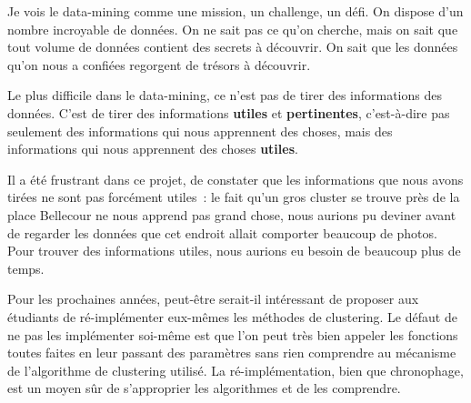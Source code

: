 Je vois le data-mining comme une mission, un challenge, un défi. On dispose d'un nombre incroyable de données. On ne sait pas ce qu'on cherche, mais on sait que tout volume de données contient des secrets à découvrir. On sait que les données qu'on nous a confiées regorgent de trésors à découvrir.

Le plus difficile dans le data-mining, ce n'est pas de tirer des informations des données. C'est de tirer des informations \textbf{utiles} et \textbf{pertinentes}, c'est-à-dire pas seulement des informations qui nous apprennent des choses, mais des informations qui nous apprennent des choses \textbf{utiles}.

Il a été frustrant dans ce projet, de constater que les informations que nous avons tirées ne sont pas forcément utiles~: le fait qu'un gros cluster se trouve près de la place Bellecour ne nous apprend pas grand chose, nous aurions pu deviner avant de regarder les données que cet endroit allait comporter beaucoup de photos. Pour trouver des informations utiles, nous aurions eu besoin de beaucoup plus de temps.

Pour les prochaines années, peut-être serait-il intéressant de proposer aux étudiants de ré-implémenter eux-mêmes les méthodes de clustering. Le défaut de ne pas les implémenter soi-même est que l'on peut très bien appeler les fonctions toutes faites en leur passant des paramètres sans rien comprendre au mécanisme de l'algorithme de clustering utilisé. La ré-implémentation, bien que chronophage, est un moyen sûr de s'approprier les algorithmes et de les comprendre.
